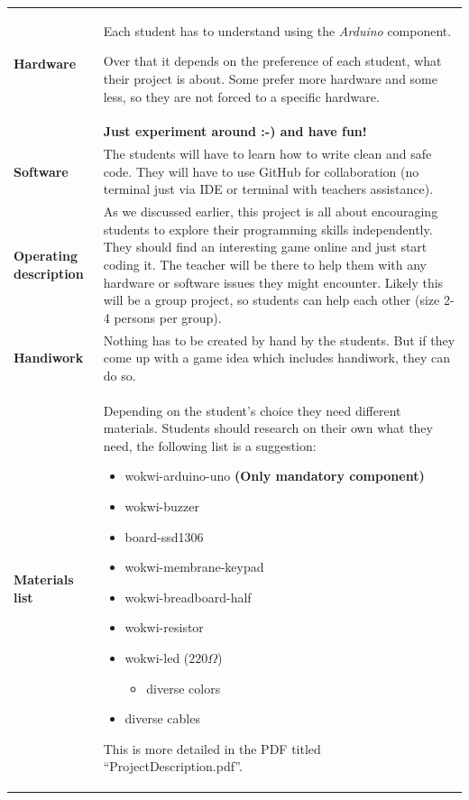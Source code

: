 \documentclass[10pt]{article}
\begin{document}
\begin{longtable}{|p{3.5cm}|p{11cm}|}
  \textbf{Hardware} & 
  Each student has to understand using the \textit{Arduino} component. 

  Over that it depends on the preference of each student, what their project is about. Some prefer more hardware and some less, so they are not forced to a specific hardware. \\ & \textbf{Just experiment around :-) and have fun!}
  \\ \hline
  
  \textbf{Software} & The students will have to learn how to write clean and safe code. They will have to use GitHub for collaboration (no terminal just via IDE or terminal with teachers assistance).  \\ \hline
  
  \textbf{Operating description} & As we discussed earlier, this project is all about encouraging students to explore their programming skills independently. They should find an interesting game online and just start coding it. The teacher will be there to help them with any hardware or software issues they might encounter. Likely this will be a group project, so students can help each other (size 2-4 persons per group).
  \\ \hline
  
  \textbf{Handiwork} & Nothing has to be created by hand by the students. But if they come up with a game idea which includes handiwork, they can do so. \\ \hline
  
  \textbf{Materials list} & 
  Depending on the student's choice they need different materials. Students should research on their own what they need, the following list is a suggestion:
  \begin{itemize}
    \item wokwi-arduino-uno \textbf{(Only mandatory component)}
    \item wokwi-buzzer
    \item board-ssd1306
    \item wokwi-membrane-keypad
    \item wokwi-breadboard-half
    \item wokwi-resistor
    \item wokwi-led ($220 \Omega$)
    \begin{itemize}
      \item diverse colors
    \end{itemize}
    \item diverse cables
  \end{itemize}
  This is more detailed in the PDF titled \enquote{ProjectDescription.pdf}.
  \\ \hline
  

\end{longtable}
\end{document}
